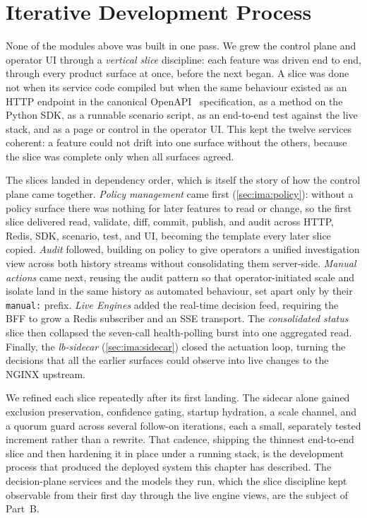 \section{Iterative Development Process}
\label{sec:ima:iterative}

None of the modules above was built in one pass. We grew the control plane and
operator UI through a \emph{vertical slice} discipline: each feature was driven end
to end, through every product surface at once, before the next began. A slice was
done not when its service code compiled but when the same behaviour existed as an
HTTP endpoint in the canonical OpenAPI~\cite{openapi} specification, as a method on
the Python SDK, as a runnable scenario script, as an end-to-end test against the
live stack, and as a page or control in the operator UI. This kept the twelve
services coherent: a feature could not drift into one surface without the others,
because the slice was complete only when all surfaces agreed.

The slices landed in dependency order, which is itself the story of how the control
plane came together. \emph{Policy management} came first (\cref{sec:ima:policy}):
without a policy surface there was nothing for later features to read or change, so
the first slice delivered read, validate, diff, commit, publish, and audit across
HTTP, Redis, SDK, scenario, test, and UI, becoming the template every later slice
copied. \emph{Audit} followed, building on policy to give operators a unified
investigation view across both history streams without consolidating them
server-side. \emph{Manual actions} came next, reusing the audit pattern so that
operator-initiated scale and isolate land in the same history as automated
behaviour, set apart only by their \texttt{manual:} prefix. \emph{Live Engines}
added the real-time decision feed, requiring the BFF to grow a Redis subscriber and
an SSE transport. The \emph{consolidated status} slice then collapsed the seven-call
health-polling burst into one aggregated read. Finally, the \emph{lb-sidecar}
(\cref{sec:ima:sidecar}) closed the actuation loop, turning the decisions that all
the earlier surfaces could observe into live changes to the NGINX upstream.

We refined each slice repeatedly after its first landing. The sidecar alone gained
exclusion preservation, confidence gating, startup hydration, a scale channel, and a
quorum guard across several follow-on iterations, each a small, separately tested
increment rather than a rewrite. That cadence, shipping the thinnest end-to-end
slice and then hardening it in place under a running stack, is the development
process that produced the deployed system this chapter has described. The
decision-plane services and the models they run, which the slice discipline kept
observable from their first day through the live engine views, are the subject of
Part~B.
